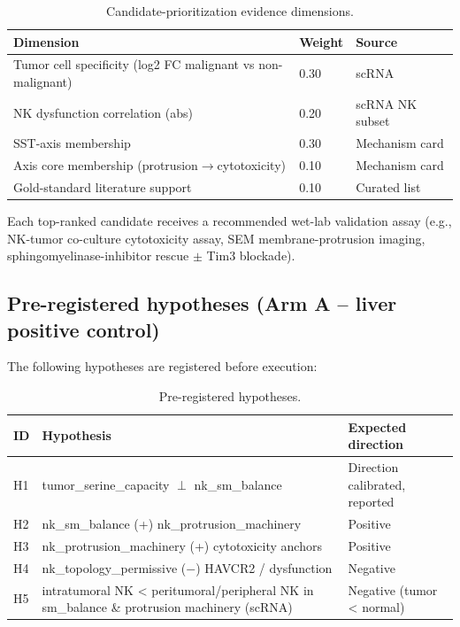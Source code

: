 \documentclass[modern,large,numbered,nocrop]{oup-authoring-template}
\begin{document}
\begin{table}[htbp]
\caption{Candidate-prioritization evidence dimensions.}
\small
\begin{tabularx}{\textwidth}{@{}lXX@{}}
\toprule
Dimension & Weight & Source \\
\midrule
Tumor cell specificity (log2 FC malignant vs non-malignant) & 0.30 & scRNA \\
NK dysfunction correlation (abs) & 0.20 & scRNA NK subset \\
SST-axis membership & 0.30 & Mechanism card \\
Axis core membership (protrusion$\to$cytotoxicity) & 0.10 & Mechanism card \\
Gold-standard literature support & 0.10 & Curated list \\
\bottomrule
\end{tabularx}
\end{table}

Each top-ranked candidate receives a recommended wet-lab validation assay (e.g., NK-tumor co-culture cytotoxicity assay, SEM membrane-protrusion imaging, sphingomyelinase-inhibitor rescue $\pm$ Tim3 blockade).

\subsection{Pre-registered hypotheses (Arm A -- liver positive control)}

The following hypotheses are registered before execution:

\begin{table}[htbp]
\caption{Pre-registered hypotheses.}
\small
\begin{tabularx}{\textwidth}{@{}lXX@{}}
\toprule
ID & Hypothesis & Expected direction \\
\midrule
H1 & tumor\_serine\_capacity $\perp$ nk\_sm\_balance & Direction calibrated, reported \\
H2 & nk\_sm\_balance (+) nk\_protrusion\_machinery & Positive \\
H3 & nk\_protrusion\_machinery (+) cytotoxicity anchors & Positive \\
H4 & nk\_topology\_permissive ($-$) HAVCR2 / dysfunction & Negative \\
H5 & intratumoral NK < peritumoral/peripheral NK in sm\_balance \& protrusion machinery (scRNA) & Negative (tumor < normal) \\
\bottomrule
\end{tabularx}
\end{table}
\end{document}
